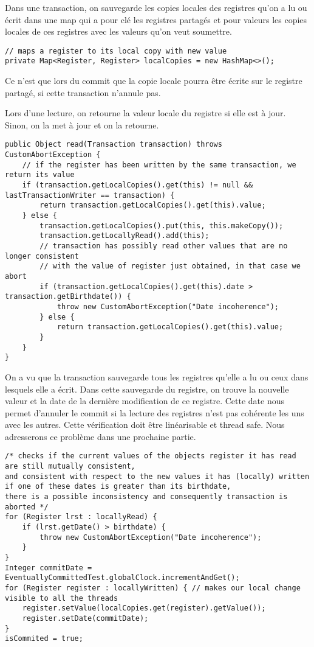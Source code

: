 \documentclass[10pt, a4paper]{article}
\begin{document}
Dans une transaction, on sauvegarde les copies locales des registres qu'on a lu ou écrit dans une map qui a pour clé les registres partagés et pour valeurs les copies locales de ces registres avec les valeurs qu'on veut soumettre.
\begin{lstlisting}[caption = localCopies]
// maps a register to its local copy with new value
private Map<Register, Register> localCopies = new HashMap<>(); 
\end{lstlisting}

Ce n'est que lors du commit que la copie locale pourra être écrite sur le registre partagé, si cette transaction n'annule pas.

Lors d'une lecture, on retourne la valeur locale du registre si elle est à jour. Sinon, on la met à jour et on la retourne.
\begin{lstlisting}[caption = read]
public Object read(Transaction transaction) throws CustomAbortException {
    // if the register has been written by the same transaction, we return its value
    if (transaction.getLocalCopies().get(this) != null && lastTransactionWriter == transaction) {
        return transaction.getLocalCopies().get(this).value;
    } else {
        transaction.getLocalCopies().put(this, this.makeCopy());
        transaction.getLocallyRead().add(this);
        // transaction has possibly read other values that are no longer consistent
        // with the value of register just obtained, in that case we abort
        if (transaction.getLocalCopies().get(this).date > transaction.getBirthdate()) {
            throw new CustomAbortException("Date incoherence");
        } else {
            return transaction.getLocalCopies().get(this).value;
        }
    }
}
\end{lstlisting}

On a vu que la transaction sauvegarde tous les registres qu'elle a lu ou ceux dans lesquels elle a écrit. Dans cette sauvegarde du registre, on trouve la nouvelle valeur et la date de la dernière modification de ce registre. Cette date nous permet d'annuler le commit si la lecture des registres n'est pas cohérente les uns avec les autres. Cette vérification doit être linéarisable et thread safe. Nous adresserons ce problème dans une prochaine partie.
\begin{lstlisting}[caption = commit]
/* checks if the current values of the objects register it has read are still mutually consistent,
and consistent with respect to the new values it has (locally) written
if one of these dates is greater than its birthdate,
there is a possible inconsistency and consequently transaction is aborted */
for (Register lrst : locallyRead) {
    if (lrst.getDate() > birthdate) {
        throw new CustomAbortException("Date incoherence");
    }
}
Integer commitDate = EventuallyCommittedTest.globalClock.incrementAndGet();
for (Register register : locallyWritten) { // makes our local change visible to all the threads
    register.setValue(localCopies.get(register).getValue());
    register.setDate(commitDate);
}
isCommited = true;
\end{lstlisting}
\end{document}
